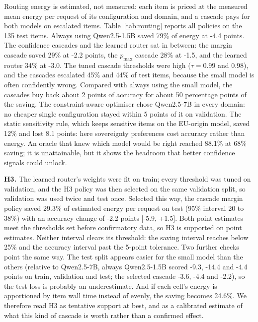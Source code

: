 Routing energy is estimated, not measured: each item is priced at the measured mean energy per request of its configuration and domain, and a cascade pays for both models on escalated items. Table~\ref{tab:routing} reports all policies on the 135 test items. Always using Qwen2.5-1.5B saved 79\% of energy at -4.4 points. The confidence cascades and the learned router sat in between: the margin cascade saved 29\% at -2.2 points, the $p_{\max}$ cascade 28\% at -1.5, and the learned router 34\% at -3.0. The tuned cascade thresholds were high ($\tau=0.99$ and 0.98), and the cascades escalated 45\% and 44\% of test items, because the small model is often confidently wrong. Compared with always using the small model, the cascades buy back about 2 points of accuracy for about 50 percentage points of the saving. The constraint-aware optimiser chose Qwen2.5-7B in every domain: no cheaper single configuration stayed within 5 points of it on validation. The static sensitivity rule, which keeps sensitive items on the EU-origin model, saved 12\% and lost 8.1 points: here sovereignty preferences cost accuracy rather than energy. An oracle that knew which model would be right reached 88.1\% at 68\% saving; it is unattainable, but it shows the headroom that better confidence signals could unlock.

\textbf{H3.} The learned router's weights were fit on train; every threshold was tuned on validation, and the H3 policy was then selected on the same validation split, so validation was used twice and test once. Selected this way, the cascade margin policy saved 29.3\% of estimated energy per request on test (95\% interval 20 to 38\%) with an accuracy change of -2.2 points [-5.9, +1.5]. Both point estimates meet the thresholds set before confirmatory data, so H3 is supported on point estimates. Neither interval clears its threshold: the saving interval reaches below 25\% and the accuracy interval past the 5-point tolerance. Two further checks point the same way. The test split appears easier for the small model than the others (relative to Qwen2.5-7B, always Qwen2.5-1.5B scored -9.3, -14.4 and -4.4 points on train, validation and test; the selected cascade -3.6, -4.4 and -2.2), so the test loss is probably an underestimate. And if each cell's energy is apportioned by item wall time instead of evenly, the saving becomes 24.6\%. We therefore read H3 as tentative support at best, and as a calibrated estimate of what this kind of cascade is worth rather than a confirmed effect.
